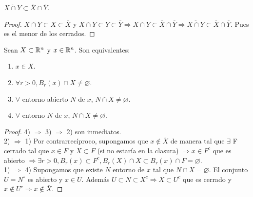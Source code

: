 \begin{prop}
  \(\overline{X \cap Y} \subset \overline{X} \cap \overline{Y}\).
  \begin{proof}
    \(X \cap Y \subset X \subset \overline{X}\) y \(X \cap Y \subset Y \subset \overline{Y} \Rightarrow X \cap Y \subset \overline{X} \cap \overline{Y} \Rightarrow \overline{X \cap Y} \subset \overline{X} \cap \overline{Y}\). Pues es el menor de los cerrados.
  \end{proof}
\end{prop}

\begin{prop}
  Sean \(X \subset \mathbb{R}^n\) y \(x \in \mathbb{R}^n\). Son equivalentes:
  \begin{enumerate}
    \item \(x \in \overline{X}\).
    \item \(\forall r > 0, B_r(x) \cap X \neq \varnothing\).
    \item \(\forall\) entorno abierto \(N\) de \(x\), \(N \cap X \neq \varnothing\).
    \item \(\forall\) entorno \(N\) de \(x\), \(N \cap X \neq \varnothing\).
  \end{enumerate}

  \begin{proof}
    4) \(\Rightarrow\) 3) \(\Rightarrow\) 2) son inmediatos. \\
    2) \(\Rightarrow\) 1) Por contrarrecíproco, supongamos que \(x \notin \overline{X}\) de manera tal que \(\exists\) F cerrado tal que \(x \in F\) y \(X \subset F\) (si no estaría en la clasura) \(\Rightarrow x \in F^c\) que es abierto \(\Rightarrow \exists r > 0, B_r(x) \subset F^c, B_r(X) \cap X \subset B_r(x) \cap F = \varnothing\). \\
    1) \(\Rightarrow\) 4) Supongamos que existe \(N\) entorno de \(x\) tal que \(N \cap X = \varnothing\). El conjunto \(U = N^{\circ}\) es abierto y \(x \in U\). Además \(U \subset N \subset X^c \Rightarrow X \subset U^c\) que es cerrado y \(x \notin U^c \Rightarrow x \notin \overline{X}\).
  \end{proof}
\end{prop}

